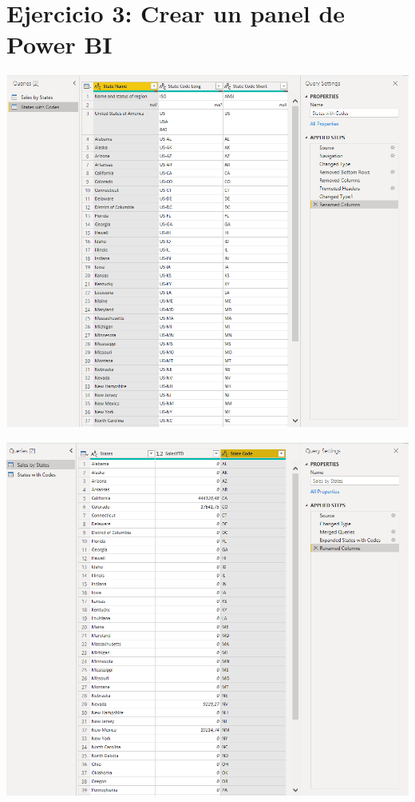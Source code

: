 \section{Ejercicio 3: Crear un panel de Power BI} 

\begin{center}
\includegraphics[width=15cm]{./Imagenes/Captura5}
\end{center}	

\begin{center}
\includegraphics[width=15cm]{./Imagenes/Captura6}
\end{center}